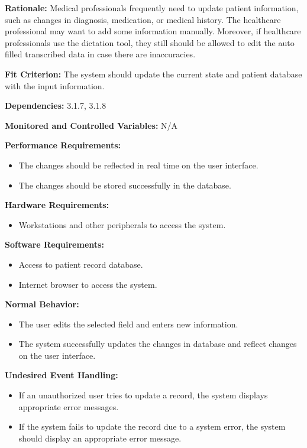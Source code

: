 \documentclass[12pt]{article}
\begin{document}
\begin{itemize}
\textbf{Rationale:} Medical professionals frequently need to update patient information, such as changes in diagnosis, medication, or medical history. The healthcare professional may want to add some information manually. Moreover, if healthcare professionals use the dictation tool, they still should be allowed to edit the auto filled transcribed data in case there are inaccuracies.

\textbf{Fit Criterion:} The system should update the current state and patient database with the input information.

\textbf{Dependencies:} 3.1.7, 3.1.8

\textbf{Monitored and Controlled Variables:} N/A

\textbf{Performance Requirements:} 
\begin{itemize}
  \item The changes should be reflected in real time on the user interface.
  \item The changes should be stored successfully in the database.
\end{itemize}

\textbf{Hardware Requirements:} 
\begin{itemize}
  \item Workstations and other peripherals to access the system.
\end{itemize}

\textbf{Software Requirements:} 
\begin{itemize}
  \item Access to patient record database.
  \item Internet browser to access the system. 
\end{itemize}

\textbf{Normal Behavior:} 
\begin{itemize}
  \item The user edits the selected field and enters new information. 
  \item The system successfully updates the changes in database and reflect changes on the user interface. 
\end{itemize}

\textbf{Undesired Event Handling:}
\begin{itemize}
  \item If an unauthorized user tries to update a record, the system displays appropriate error messages. 
  \item If the system fails to update the record due to a system error, the system should display an appropriate error message. 
\end{itemize}



\end{itemize}
\end{document}
